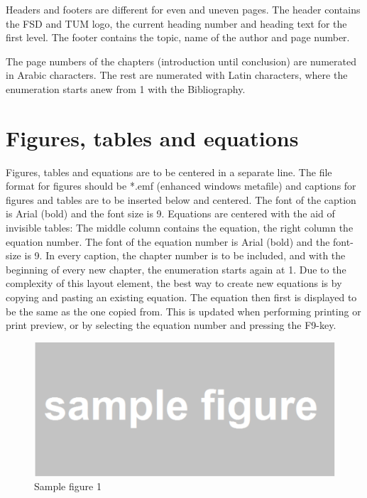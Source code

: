 \documentclass[11pt, a4paper, twoside]{report}
\begin{document}
Headers and footers are different for even and uneven pages. The header contains the FSD and TUM logo, the current heading number and heading text for the first level. The footer contains the topic, name of the author and page number.

The page numbers of the chapters (introduction until conclusion) are numerated in Arabic characters. The rest are numerated with Latin characters, where the enumeration starts anew from 1 with the Bibliography.


\section{Figures, tables and equations} \label{sec:figs_tabs_eqs}

Figures, tables and equations are to be centered in a separate line. The file format for figures should be *.emf (enhanced windows metafile) and captions for figures and tables are to be inserted below and centered. The font of the caption is Arial (bold) and the font size is 9. Equations are centered with the aid of invisible tables: The middle column contains the equation, the right column the equation number. The font of the equation number is Arial (bold) and the font-size is 9. In every caption, the chapter number is to be included, and with the beginning of every new chapter, the enumeration starts again at 1. Due to the complexity of this layout element, the best way to create new equations is by copying and pasting an existing equation. The equation then first is displayed to be the same as the one copied from. This is updated when performing printing or print preview, or by selecting the equation number and pressing the F9-key.

\begin{figure}[H]
  \centering 
  \includegraphics[width=1 \linewidth]{figs/fig_sample_1.pdf}
  \captionsetup{justification=raggedright, singlelinecheck=off, font=bf, belowskip=-0.5cm}
  \caption[Sample figure 1]{Sample figure 1}
  \label{fig:sample_1}
\end{figure} 
\end{document}
